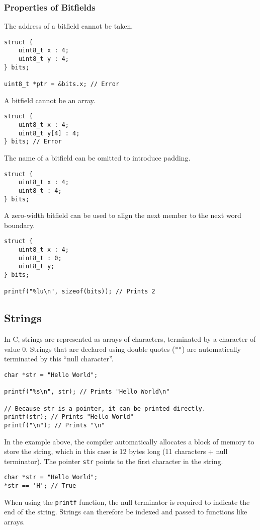 \documentclass{article}
\begin{document}
\subsubsection{Properties of Bitfields}
The address of a bitfield cannot be taken.
\begin{verbatim}
struct {
    uint8_t x : 4;
    uint8_t y : 4;
} bits;

uint8_t *ptr = &bits.x; // Error
\end{verbatim}
A bitfield cannot be an array.
\begin{verbatim}
struct {
    uint8_t x : 4;
    uint8_t y[4] : 4;
} bits; // Error
\end{verbatim}
The name of a bitfield can be omitted to introduce padding.
\begin{verbatim}
struct {
    uint8_t x : 4;
    uint8_t : 4;
} bits;
\end{verbatim}
A zero-width bitfield can be used to align the next member to the next
word boundary.
\begin{verbatim}
struct {
    uint8_t x : 4;
    uint8_t : 0;
    uint8_t y;
} bits;

printf("%lu\n", sizeof(bits)); // Prints 2
\end{verbatim}
\subsection{Strings}
In C, strings are represented as arrays of characters, terminated by a
character of value 0. Strings that are declared using double quotes
(\texttt{""}) are automatically terminated by this ``null
character''.
\begin{verbatim}
char *str = "Hello World";

printf("%s\n", str); // Prints "Hello World\n"

// Because str is a pointer, it can be printed directly.
printf(str); // Prints "Hello World"
printf("\n"); // Prints "\n"
\end{verbatim}
In the example above, the compiler automatically allocates a block of
memory to store the string, which in this case is 12 bytes long (11
characters + null terminator). The pointer \texttt{str} points
to the first character in the string.
\begin{verbatim}
char *str = "Hello World";
*str == 'H'; // True
\end{verbatim}
When using the \texttt{printf} function, the null terminator is
required to indicate the end of the string. Strings can therefore be
indexed and passed to functions like arrays.
\end{document}
